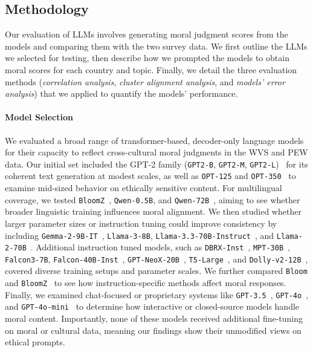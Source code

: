 \documentclass[runningheads]{llncs}
\begin{document}
\subsection{Methodology}

Our evaluation of LLMs involves generating moral judgment scores from the models and comparing them with the two survey data. We first outline the LLMs we selected for testing, then describe how we prompted the models to obtain moral scores for each country and topic. Finally, we detail the three evaluation methods (\emph{correlation analysis}, \emph{cluster alignment analysis}, and \emph{models' error analysis}) that we applied to quantify the models' performance.


\paragraph{Model Selection}
We evaluated a broad range of transformer-based, decoder-only language models for their capacity to reflect cross-cultural moral judgments in the WVS and PEW data. Our initial set included the GPT-2 family (\texttt{GPT2-B}, \texttt{GPT2-M}, \texttt{GPT2-L})~\cite{Radford2019} for its coherent text generation at modest scales, as well as \texttt{OPT-125} and \texttt{OPT-350}~\cite{Zhang2022} to examine mid-sized behavior on ethically sensitive content. For multilingual coverage, we tested \texttt{BloomZ}~\cite{Muennighoff2023}, \texttt{Qwen-0.5B}, and \texttt{Qwen-72B}~\cite{Bai2023}, aiming to see whether broader linguistic training influences moral alignment. We then studied whether larger parameter sizes or instruction tuning could improve consistency by including \texttt{Gemma-2-9B-IT}~\cite{Mesnard2024}, \texttt{Llama-3-8B}, \texttt{Llama-3.3-70B-Instruct}~\cite{Touvron2023a}, and \texttt{Llama-2-70B}~\cite{Touvron2023b}. Additional instruction tuned models, such as \texttt{DBRX-Inst}~\cite{Conover2023a}, \texttt{MPT-30B}~\cite{MosaicML2023}, \texttt{Falcon3-7B}, \texttt{Falcon-40B-Inst}~\cite{Almazrouei2023}, \texttt{GPT-NeoX-20B}~\cite{Black2022}, \texttt{T5-Large}~\cite{raffel2020exploring}, and \texttt{Dolly-v2-12B}~\cite{Conover2023b}, covered diverse training setups and parameter scales. We further compared \texttt{Bloom} \cite{LeScao2022} and \texttt{BloomZ}~\cite{Muennighoff2023} to see how instruction-specific methods affect moral responses. Finally, we examined chat-focused or proprietary systems like \texttt{GPT‑3.5}~\cite{brown2020language}, \texttt{GPT‑4o}~\cite{OpenAI2024b}, and \texttt{GPT‑4o‑mini}~\cite{OpenAI2024a} to determine how interactive or closed-source models handle moral content. Importantly, none of these models received additional fine-tuning on moral or cultural data, meaning our findings show their unmodified views on ethical prompts.
\end{document}
